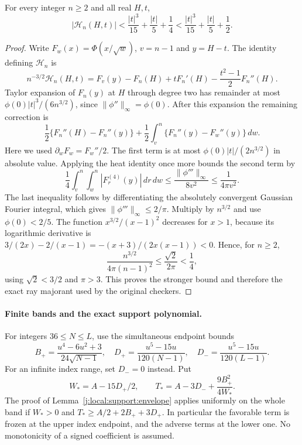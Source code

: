 \begin{lemma}
\label{j:local:ext:global-gaussian-ray}
For every integer $n\ge2$ and all real $H,t$,
\[
 |\mathcal H_n(H,t)|
 <\frac{|t|^3}{15}+\frac{|t|}{5}+\frac14
 <\frac{|t|^3}{15}+\frac{|t|}{5}+\frac12.
\]
\end{lemma}
\begin{proof}
Write $F_w(x)=\Phi(x/\sqrt w)$, $v=n-1$ and $y=H-t$.
The identity defining $\mathcal H_n$ is
\[
 n^{-3/2}\mathcal H_n(H,t)
 =F_v(y)-F_n(H)+tF_n'(H)-\frac{t^2-1}{2}F_n''(H).
\]
Taylor expansion of $F_n(y)$ at $H$ through degree two has remainder
at most $\phi(0)|t|^3/(6n^{3/2})$, since
$\|\phi''\|_\infty=\phi(0)$.
After this expansion the remaining correction is
\[
 \frac12\{F_n''(H)-F_n''(y)\}
 +\frac12\int_v^n\{F_n''(y)-F_w''(y)\}\,dw.
\]
Here we used $\partial_wF_w=F_w''/2$. The first term is at most
$\phi(0)|t|/(2n^{3/2})$ in absolute value. Applying the heat identity
once more bounds the second term by
\[
 \frac14\int_v^n\int_w^n
       |F_r^{(4)}(y)|\,dr\,dw
 \le\frac{\|\phi'''\|_\infty}{8v^2}
 \le\frac1{4\pi v^2}.
\]
The last inequality follows by differentiating the absolutely
convergent Gaussian Fourier integral, which gives
$\|\phi'''\|_\infty\le2/\pi$. Multiply by $n^{3/2}$ and use
$\phi(0)<2/5$. The function $x^{3/2}/(x-1)^2$ decreases for $x>1$,
because its logarithmic derivative is
$3/(2x)-2/(x-1)=-(x+3)/(2x(x-1))<0$. Hence, for $n\ge2$,
\[
 \frac{n^{3/2}}{4\pi(n-1)^2}
 \le\frac{\sqrt2}{2\pi}<\frac14,
\]
using $\sqrt2<3/2$ and $\pi>3$. This proves the stronger bound and
therefore the exact ray majorant used by the original checkers.
\end{proof}

\paragraph{Finite bands and the exact support polynomial.}\label{j:local:support:polynomial}
For integers $36\le N\le L$, use the simultaneous endpoint bounds
\[
 B_+=\frac{u^4-6u^2+3}{24\sqrt{N-1}},\quad
 D_+=\frac{u^5-15u}{120(N-1)},\quad
 D_-=\frac{u^5-15u}{120(L-1)}.
\]
For an infinite index range, set $D_-=0$ instead. Put
\[
 W_*=A-15D_+/2,\qquad
 T_*=A-3D_-+\frac{9B_+^2}{4W_*}.
\]
The proof of Lemma~\ref{j:local:support:envelope} applies uniformly on the whole band
if $W_*>0$ and $T_*\ge A/2+2B_++3D_+$. In particular the favorable
term is frozen at the upper index endpoint, and the adverse terms at
the lower one. No monotonicity of a signed coefficient is assumed.

